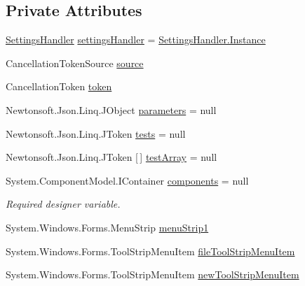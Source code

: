 \subsection*{Private Attributes}
\begin{DoxyCompactItemize}
\item 
\mbox{\hyperlink{class_cert_complete_1_1_settings_handler}{Settings\+Handler}} \mbox{\hyperlink{class_cert_complete_1_1_cert_complete_a43be90efbcc884bafc8b07f821c48b6b}{settings\+Handler}} = \mbox{\hyperlink{class_cert_complete_1_1_settings_handler_a7c4f8eb33b1113986d52942f93e52da8}{Settings\+Handler.\+Instance}}
\item 
Cancellation\+Token\+Source \mbox{\hyperlink{class_cert_complete_1_1_cert_complete_a788052da36a4c2ce24199a262cebfec8}{source}}
\item 
Cancellation\+Token \mbox{\hyperlink{class_cert_complete_1_1_cert_complete_aad34f573c91ef12a2d4fc81afd12b0d2}{token}}
\item 
Newtonsoft.\+Json.\+Linq.\+J\+Object \mbox{\hyperlink{class_cert_complete_1_1_cert_complete_a843ac34ed8e64b4c34419457ddc770ab}{parameters}} = null
\item 
Newtonsoft.\+Json.\+Linq.\+J\+Token \mbox{\hyperlink{class_cert_complete_1_1_cert_complete_ad5d2d2d98102b330f95d658a185d8bfd}{tests}} = null
\item 
Newtonsoft.\+Json.\+Linq.\+J\+Token \mbox{[}$\,$\mbox{]} \mbox{\hyperlink{class_cert_complete_1_1_cert_complete_a20e1caea6cfe04d96bc96d678af0d3a2}{test\+Array}} = null
\item 
System.\+Component\+Model.\+I\+Container \mbox{\hyperlink{class_cert_complete_1_1_cert_complete_a18b5a668a8e8d49eed05cff490058208}{components}} = null
\begin{DoxyCompactList}\small\item\em Required designer variable. \end{DoxyCompactList}\item 
System.\+Windows.\+Forms.\+Menu\+Strip \mbox{\hyperlink{class_cert_complete_1_1_cert_complete_a03112ef58c5d94b4a428f822efd937a2}{menu\+Strip1}}
\item 
System.\+Windows.\+Forms.\+Tool\+Strip\+Menu\+Item \mbox{\hyperlink{class_cert_complete_1_1_cert_complete_a158ee264c36d528ceed80853069846b0}{file\+Tool\+Strip\+Menu\+Item}}
\item 
System.\+Windows.\+Forms.\+Tool\+Strip\+Menu\+Item \mbox{\hyperlink{class_cert_complete_1_1_cert_complete_ab1e6973dc161b91a23050e18c4838705}{new\+Tool\+Strip\+Menu\+Item}}
\item 

\end{DoxyCompactItemize}
